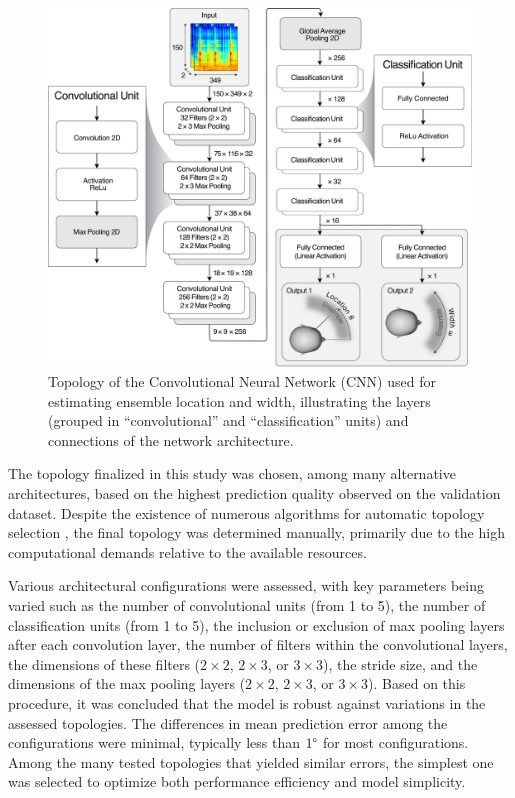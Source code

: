 \documentclass[11pt]{article}
\begin{document}
\begin{figure}[ht!]
  \centering
  \includegraphics[width=\linewidth]{../pictures/architecture.pdf}
  \caption{\label{fig:architecture}Topology of the Convolutional Neural Network (CNN) used for estimating ensemble location and width, illustrating the layers (grouped in ``convolutional'' and ``classification'' units) and connections of the network architecture.}
\end{figure}

The topology finalized in this study was chosen, among many alternative architectures, based on the highest prediction quality observed on the validation dataset. Despite the existence of numerous algorithms for automatic topology selection \parencite{branke_evolutionary_1995, zhang_finding_2018, miikkulainen_evolving_2017, stanley_evolving_2002, shafiee_deep_2016}, the final topology was determined manually, primarily due to the high computational demands relative to the available resources.

Various architectural configurations were assessed, with key parameters being varied such as the number of convolutional units (from 1 to 5), the number of classification units (from 1 to 5), the inclusion or exclusion of max pooling layers after each convolution layer, the number of filters within the convolutional layers, the dimensions of these filters ($2 \times 2$, $2 \times 3$, or $3 \times 3$), the stride size, and the dimensions of the max pooling layers ($2 \times 2$, $2 \times 3$, or $3 \times 3$). Based on this procedure, it was concluded that the model is robust against variations in the assessed topologies. The differences in mean prediction error among the configurations were minimal, typically less than $1\degree$ for most configurations. Among the many tested topologies that yielded similar errors, the simplest one was selected to optimize both performance efficiency and model simplicity.
\end{document}
